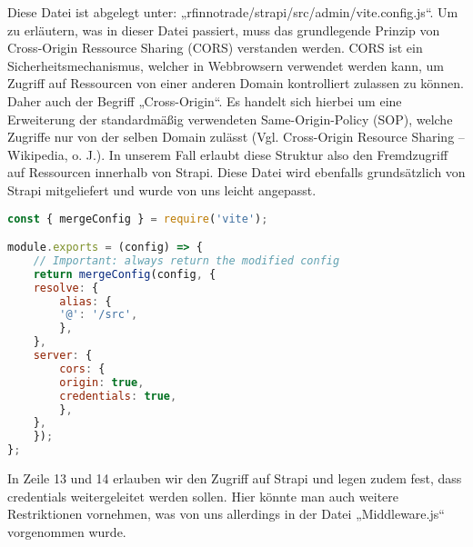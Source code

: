 Diese Datei ist abgelegt unter: „rfinnotrade/strapi/src/admin/vite.config.js“.
Um zu erläutern, was in dieser Datei passiert, muss das grundlegende Prinzip von Cross-Origin Ressource Sharing (CORS) verstanden werden. CORS ist ein Sicherheitsmechanismus, welcher in Webbrowsern verwendet werden kann, um Zugriff auf Ressourcen von einer anderen Domain kontrolliert zulassen zu können. Daher auch der Begriff „Cross-Origin“. Es handelt sich hierbei um eine Erweiterung der standardmäßig verwendeten Same-Origin-Policy (SOP), welche Zugriffe nur von der selben Domain zulässt (Vgl. Cross-Origin Resource Sharing – Wikipedia, o. J.). In unserem Fall erlaubt diese Struktur also den Fremdzugriff auf Ressourcen innerhalb von Strapi.
Diese Datei wird ebenfalls grundsätzlich von Strapi mitgeliefert und wurde von uns leicht angepasst.

\begin{lstlisting}[language=JavaScript, caption={Vite.config.js}, label={lst:viteconfigjs}]
const { mergeConfig } = require('vite');

module.exports = (config) => {
    // Important: always return the modified config
    return mergeConfig(config, {
    resolve: {
        alias: {
        '@': '/src',
        },
    },
    server: {
        cors: {
        origin: true,
        credentials: true,
        },
    },
    });
};
\end{lstlisting}

In Zeile 13 und 14 erlauben wir den Zugriff auf Strapi und legen zudem fest, dass credentials weitergeleitet werden sollen. Hier könnte man auch weitere Restriktionen vornehmen, was von uns allerdings in der Datei „Middleware.js“ vorgenommen wurde.